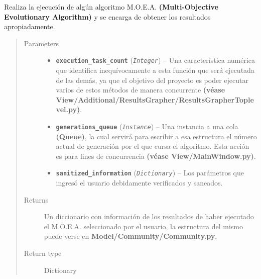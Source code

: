 \documentclass[letterpaper,10pt,english]{sphinxmanual}
\begin{document}
\begin{fulllineitems}
\begin{fulllineitems}
\label{Controller/ControllerClass:Controller.Controller.Controller.execute_procedure}
Realiza la ejecución de algún algoritmo M.O.E.A.
\textbf{(Multi-Objective Evolutionary Algorithm)} y se encarga
de obtener los resultados apropiadamente.
\begin{quote}\begin{description}
\item[{Parameters}] \leavevmode\begin{itemize}
\item {} 
\textbf{\texttt{execution\_task\_count}} (\emph{\texttt{Integer}}) -- Una característica numérica que identifica inequívocamente
a esta función que será ejecutada de las demás, ya que el objetivo
del proyecto es poder ejecutar varios de estos métodos de manera
concurrente \textbf{(véase View/Additional/ResultsGrapher/ResultsGrapherToplevel.py)}.

\item {} 
\textbf{\texttt{generations\_queue}} (\emph{\texttt{Instance}}) -- Una instancia a una cola \textbf{(Queue)}, la cual servirá para
escribir a esa estructura el número actual de generación
por el que cursa el algoritmo. Esta acción es para fines de 
concurrencia \textbf{(véase View/MainWindow.py)}.

\item {} 
\textbf{\texttt{sanitized\_information}} (\emph{\texttt{Dictionary}}) -- Los parámetros que ingresó el usuario
debidamente verificados y saneados.

\end{itemize}

\item[{Returns}] \leavevmode
Un diccionario con información de los resultados de haber
ejecutado el M.O.E.A. seleccionado por el usuario, la
estructura del mismo puede verse en \textbf{Model/Community/Community.py}.

\item[{Return type}] \leavevmode
Dictionary

\end{description}\end{quote}

\end{fulllineitems}



\end{fulllineitems}
\end{document}
